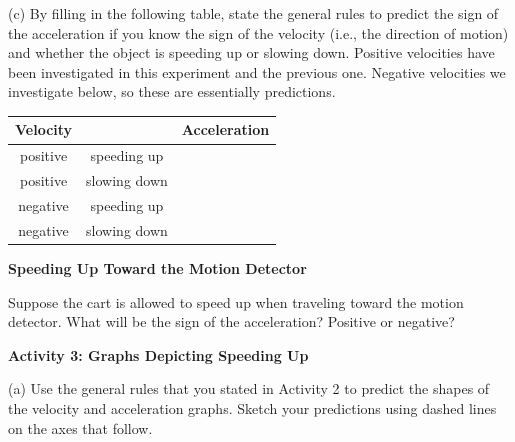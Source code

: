(c) By filling in the following table, state the general rules to predict the 
sign of the acceleration if you know the sign of the velocity (i.e., the 
direction of motion) and whether the object is speeding up or slowing down. 
Positive velocities have been investigated in this experiment and the previous 
one. Negative velocities we investigate below, so these are essentially 
predictions.

\vspace{0.3cm}
{\centering \begin{tabular}{|c|c|c|}
\hline
Velocity&
&
Acceleration\\
\hline
positive&
speeding up&
\\
\hline
positive&
slowing down&
\\
\hline
negative&
speeding up&
\\
\hline
negative&
slowing down&
\\
\hline
\end{tabular}\par}
\vspace{0.3cm}

\textbf{Speeding Up Toward the Motion Detector} 

Suppose the cart is allowed to speed up when traveling toward the motion 
detector. What will be the sign of the acceleration? Positive or negative? 

\textbf{Activity 3: Graphs Depicting Speeding Up} 

(a) Use the general rules that you stated in Activity 2 to predict the shapes
of the velocity and acceleration graphs. Sketch your predictions using dashed
lines on the axes that follow.

